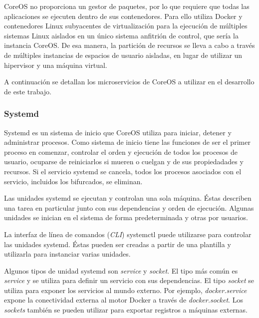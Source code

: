 
CoreOS no proporciona un gestor de paquetes, por lo que requiere que todas las aplicaciones se ejecuten dentro de sus contenedores. Para ello utiliza Docker y contenedores Linux subyacentes de virtualización para la ejecución de múltiples sistemas Linux aislados en un único sistema anfitrión de control, que sería la instancia CoreOS. De esa manera, la partición de recursos se lleva a cabo a través de múltiples instancias de espacios de usuario aisladas, en lugar de utilizar un hipervisor y una máquina virtual.

A continuación se detallan los microservicios de CoreOS a utilizar en el desarrollo de este trabajo.

\subsubsection{Systemd}

Systemd es un sistema de inicio que CoreOS utiliza para iniciar, detener y administrar procesos. Como sistema de inicio tiene las funciones de ser el primer proceso en comenzar, controlar el orden y ejecución de todos los procesos de usuario, ocuparse de reiniciarlos si mueren o cuelgan y de sus propiedadades y recursos. Si el servicio systemd se cancela, todos los procesos asociados con el servicio, incluidos los bifurcados, se eliminan. 

Las unidades systemd se ejecutan y controlan una sola máquina. Éstas describen una tarea en particular junto con sus dependencias y orden de ejecución. Algunas unidades se inician en el sistema de forma predeterminada y otras por usuarios.

La interfaz de línea de comandos (\textit{CLI}) systemctl puede utilizarse para controlar las unidades systemd. Éstas pueden ser creadas a partir de una plantilla y utilizarla para instanciar varias unidades.

Algunos tipos de unidad systemd son \textit{service} y \textit{socket}. El tipo más común es \textit{service} y se utiliza para definir un servicio con sus dependencias. El tipo \textit{socket} se utiliza para exponer los servicios al mundo externo. Por ejemplo, \textit{docker.service} expone la conectividad externa al motor Docker a través de \textit{docker.socket}. Los \textit{sockets} también se pueden utilizar para exportar registros a máquinas externas.

